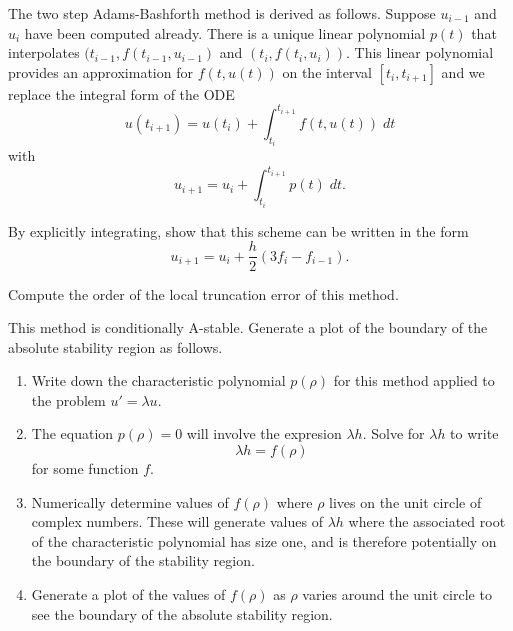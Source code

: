 \documentclass[minion]{homework}
\begin{document}
\begin{problems}
\problem The two step Adams-Bashforth method is derived as follows.
Suppose $u_{i-1}$ and $u_i$ have been computed already.  There
is a unique linear polynomial $p(t)$ that interpolates 
$(t_{i-1},f(t_{i-1},u_{i-1})$ and $(t_i,f(t_i,u_i))$.  This
linear polynomial provides an approximation for $f(t,u(t))$
on the interval $[t_i,t_{i+1}]$ and we replace the integral
form of the ODE
\[
u(t_{i+1}) = u(t_i) + \int_{t_i}^{t_{i+1}} f(t,u(t))\;dt
\]
with
\[
u_{i+1} = u_i + \int_{t_i}^{t_{i+1}} p(t) \;dt.
\]
\begin{subproblems}
\item By explicitly integrating, show that this scheme can be written
in the form
\[
u_{i+1} = u_i + \frac{h}{2}(3f_i-f_{i-1}).
\]
\item Compute the order of the local truncation error of this method.
\item This method is conditionally A-stable.  Generate a plot
of the boundary of the absolute stability region as follows.
\begin{enumerate}
	\item Write down the characteristic polynomial $p(\rho)$ for this method applied to the problem $u'=\lambda u$.
	\item The equation $p(\rho)=0$ will involve the expresion $\lambda h$.  Solve for $\lambda h$ to write
	\[
       \lambda h = f(\rho)
	\]
	for some function $f$.
	\item Numerically determine values of $f(\rho)$ where $\rho$ lives on the unit circle of complex numbers.  These will 
	generate values of
	$\lambda h$ where the associated root of the characteristic
	polynomial has size one, and is therefore potentially on the 
	boundary of the stability region.
	\item Generate a plot of the values of $f(\rho)$ as $\rho$
	varies around the unit circle to see the boundary of the 
	absolute stability region.
\end{enumerate}
\end{subproblems}
\end{problems}
\end{document}
